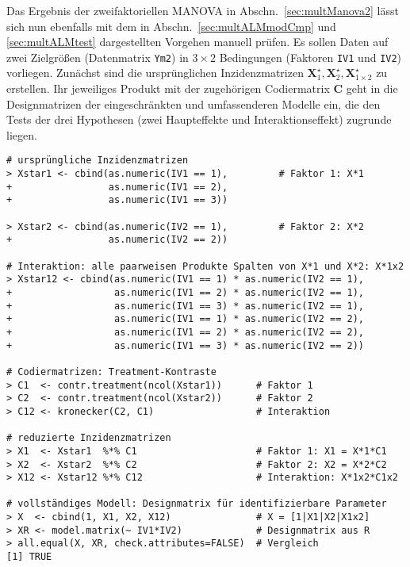Das Ergebnis der zweifaktoriellen MANOVA in Abschn.\ \ref{sec:multManova2} lässt sich nun ebenfalls mit dem in Abschn.\ \ref{sec:multALMmodCmp} und \ref{sec:multALMtest} dargestellten Vorgehen manuell prüfen. Es sollen Daten auf zwei Zielgrößen (Datenmatrix \lstinline!Ym2!) in $3 \times 2$ Bedingungen (Faktoren \lstinline!IV1! und \lstinline!IV2!) vorliegen. Zunächst sind die ursprünglichen Inzidenzmatrizen $\bm{X}_{1}^{\star}, \bm{X}_{2}^{\star}, \bm{X}_{1 \times 2}^{\star}$ zu erstellen. Ihr jeweiliges Produkt mit der zugehörigen Codiermatrix $\bm{C}$ geht in die Designmatrizen der eingeschränkten und umfassenderen Modelle ein, die den Tests der drei Hypothesen (zwei Haupteffekte und Interaktionseffekt) zugrunde liegen.
\begin{lstlisting}
# ursprüngliche Inzidenzmatrizen
> Xstar1 <- cbind(as.numeric(IV1 == 1),         # Faktor 1: X*1
+                 as.numeric(IV1 == 2),
+                 as.numeric(IV1 == 3))

> Xstar2 <- cbind(as.numeric(IV2 == 1),         # Faktor 2: X*2
+                 as.numeric(IV2 == 2))

# Interaktion: alle paarweisen Produkte Spalten von X*1 und X*2: X*1x2
> Xstar12 <- cbind(as.numeric(IV1 == 1) * as.numeric(IV2 == 1),
+                  as.numeric(IV1 == 2) * as.numeric(IV2 == 1),
+                  as.numeric(IV1 == 3) * as.numeric(IV2 == 1),
+                  as.numeric(IV1 == 1) * as.numeric(IV2 == 2),
+                  as.numeric(IV1 == 2) * as.numeric(IV2 == 2),
+                  as.numeric(IV1 == 3) * as.numeric(IV2 == 2))

# Codiermatrizen: Treatment-Kontraste
> C1  <- contr.treatment(ncol(Xstar1))      # Faktor 1
> C2  <- contr.treatment(ncol(Xstar2))      # Faktor 2
> C12 <- kronecker(C2, C1)                  # Interaktion

# reduzierte Inzidenzmatrizen
> X1  <- Xstar1  %*% C1                     # Faktor 1: X1 = X*1*C1
> X2  <- Xstar2  %*% C2                     # Faktor 2: X2 = X*2*C2
> X12 <- Xstar12 %*% C12                    # Interaktion: X*1x2*C1x2

# vollständiges Modell: Designmatrix für identifizierbare Parameter
> X  <- cbind(1, X1, X2, X12)               # X = [1|X1|X2|X1x2]
> XR <- model.matrix(~ IV1*IV2)             # Designmatrix aus R
> all.equal(X, XR, check.attributes=FALSE)  # Vergleich
[1] TRUE
\end{lstlisting}

